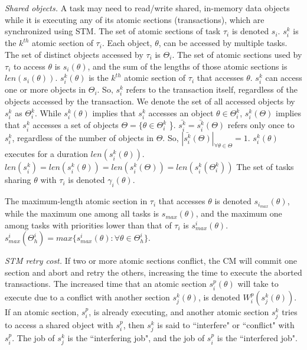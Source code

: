 \documentclass[conference]{IEEEtran}
\begin{document}
\textit{Shared objects.}
 A task may need to read/write shared, in-memory data objects while it is executing any of its atomic sections (transactions), which are synchronized using STM. 
The set of atomic sections of task $\tau_i$ is denoted $s_i$. $s_i^k$ is the $k^{th}$ atomic section of $\tau_i$. Each object, $\theta$, can be accessed by multiple tasks. The set of distinct objects accessed by $\tau_i$ is $\Theta_i$. The set of atomic sections used by $\tau_i$ to access $\theta$ is $s_i(\theta)$, and the sum of the lengths of those atomic sections is $len(s_i(\theta))$. $s_i^k(\theta)$ is the $k^{th}$ atomic section of $\tau_i$ that accesses $\theta$.
%
 $s_i^k$ can access one or more objects in $\Theta_i$. So, $s_i^k$ refers to the transaction itself, regardless of the objects accessed by the transaction. We denote the set of all accessed objects by $s_i^k$ as $\Theta_i^k$. While $s_i^k(\theta)$ implies that $s_i^k$ accesses an object $\theta \in \Theta_i^k$, $s_i^k(\Theta)$ implies that $s_i^k$ accesses a set of objects $\Theta=\{\theta \in \Theta_i^k$ \}. $\bar{s_i^k}=\bar{s_i^k}(\Theta)$ refers only once to $s_i^k$, regardless of the number of objects in $\Theta$. So, $|\bar{s_i^k}(\Theta)|_{\forall \theta \in \Theta}=1$.
%
 $s_i^k(\theta)$  executes for a duration $len(s_i^k(\theta))$. $len(s_i^k)=len(s_i^k(\theta))=len(s_i^k(\Theta))=len(s_i^k(\Theta_i^k))$ The set of tasks sharing $\theta$ with $\tau_i$ is denoted $\gamma_i(\theta)$. 

The maximum-length atomic section in $\tau_i$ that accesses $\theta$ is denoted $s_{i_{max}} (\theta)$, while the maximum one among all tasks is $s_{max} (\theta)$, and the maximum one among tasks with priorities lower than that of $\tau_i$ is $s_{max}^i (\theta)$. $s_{max}^i(\Theta_h^i)=max\{s_{max}^i(\theta):\forall \theta \in \Theta_h^i\}$.

\textit{STM retry cost.} If two or more atomic sections conflict, the CM will commit one section and abort and retry the others, increasing the time to execute the aborted transactions. The increased time that an atomic section $s_i^p (\theta)$ will take to execute due to a conflict with another section $s_j^k (\theta)$, is denoted $W_{i}^{p}(s_{j}^{k}(\theta))$. If an atomic section, $s_i^p$, is already executing, and another atomic section $s_j^k$ tries to access a shared object with $s_i^p$, then $s_j^k$ is said to ``interfere" or ``conflict" with $s_i^p$. The job of $s_j^k$ is the ``interfering job", and the job of $s_i^p$ is the ``interfered job".
\end{document}
